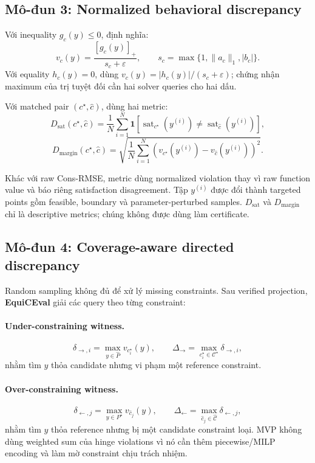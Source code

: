 \documentclass[11pt,a4paper]{article}
\newcommand{\method}{\textsf{\textbf{EquiCEval}}\xspace}
\begin{document}
\subsection{Mô-đun 3: Normalized behavioral discrepancy}

Với inequality \(g_c(y)\leq0\), định nghĩa:
\[
v_c(y)=\frac{[g_c(y)]_+}{s_c+\varepsilon},
\qquad
s_c=\max\{1,\|a_c\|_1,|b_c|\}.
\]
Với equality \(h_c(y)=0\), dùng
\(v_c(y)=|h_c(y)|/(s_c+\varepsilon)\); chứng nhận maximum của trị tuyệt đối cần
hai solver queries cho hai dấu.

Với matched pair \((c^\star,\hat c)\), dùng hai metric:
\[
D_{\mathrm{sat}}(c^\star,\hat c)=
\frac1N\sum_{i=1}^{N}
\mathbf 1\!\left[
\operatorname{sat}_{c^\star}(y^{(i)})
\neq
\operatorname{sat}_{\hat c}(y^{(i)})
\right],
\]
\[
D_{\mathrm{margin}}(c^\star,\hat c)=
\sqrt{\frac1N\sum_{i=1}^{N}
\left(v_{c^\star}(y^{(i)})-v_{\hat c}(y^{(i)})\right)^2}.
\]

Khác với raw Cons-RMSE, metric dùng normalized violation thay vì raw function
value và báo riêng satisfaction disagreement. Tập \(y^{(i)}\) được đổi thành
targeted points gồm feasible, boundary và parameter-perturbed samples.
\(D_{\mathrm{sat}}\) và \(D_{\mathrm{margin}}\) chỉ là descriptive metrics;
chúng không được dùng làm certificate.

\subsection{Mô-đun 4: Coverage-aware directed discrepancy}

Random sampling không đủ để xử lý missing constraints. Sau verified projection,
\method giải các query theo từng constraint:

\paragraph{Under-constraining witness.}
\[
\delta_{\rightarrow,i}=
\max_{y\in\widehat P}v_{c_i^\star}(y),
\qquad
\Delta_{\rightarrow}=\max_{c_i^\star\in\mathcal C^\star}
\delta_{\rightarrow,i},
\]
nhằm tìm \(y\) thỏa candidate nhưng vi phạm một reference constraint.

\paragraph{Over-constraining witness.}
\[
\delta_{\leftarrow,j}=
\max_{y\in P^\star}v_{\hat c_j}(y),
\qquad
\Delta_{\leftarrow}=\max_{\hat c_j\in\widehat{\mathcal C}}
\delta_{\leftarrow,j},
\]
nhằm tìm \(y\) thỏa reference nhưng bị một candidate constraint loại.
MVP không dùng weighted sum của hinge violations vì nó cần thêm piecewise/MILP
encoding và làm mờ constraint chịu trách nhiệm.
\end{document}
